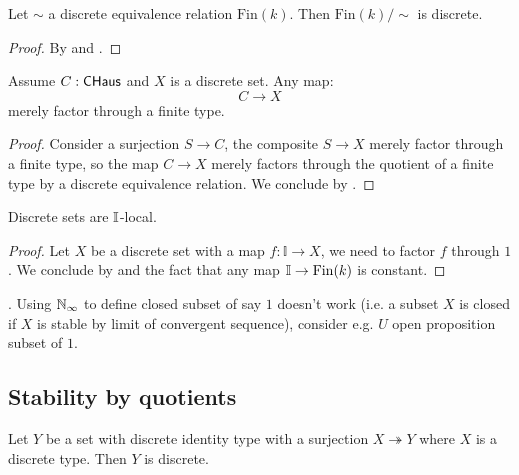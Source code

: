 \begin{corollary}
Let $\sim$ a discrete equivalence relation $\mathrm{Fin}(k)$. Then $\mathrm{Fin}(k)/\sim$ is discrete.
\end{corollary}

\begin{proof}
By  and .
\end{proof}

\begin{lemma}\label{compact-hausdorff-discrete-quotient-finite-factorisation}
Assume $C:\mathsf{CHaus}$ and $X$ is a discrete set. Any map:
\[C\to X\]
merely factor through a finite type. 
\end{lemma}

\begin{proof}
Consider a surjection $S\to C$, the composite $S\to X$ merely factor through a finite type, so the map $C\to X$ merely factors through the quotient of a finite type by a discrete equivalence relation. We conclude by .
\end{proof}

\begin{proposition}
Discrete sets are $\mathbb{I}$-local.
\end{proposition}

\begin{proof}
Let $X$ be a discrete set with a map $f:\mathbb{I}\to X$, we need to factor $f$ through $1$. We conclude by  and the fact that any map $\mathbb{I}\to \mathrm{Fin}(k)$ is constant.
\end{proof}

\begin{remark}
. Using $\mathbb{N}_{\infty}$ to define closed subset of say $1$ doesn't work (i.e. a subset $X$ is closed if $X$ is stable by limit of convergent sequence), consider e.g. $U$ open proposition subset of $1$.
\end{remark}


\subsection{Stability by quotients}

\begin{lemma}
Let $Y$ be a set with discrete identity type with a surjection $X\twoheadrightarrow Y$ where $X$ is a discrete type. Then $Y$ is discrete.
\end{lemma}

